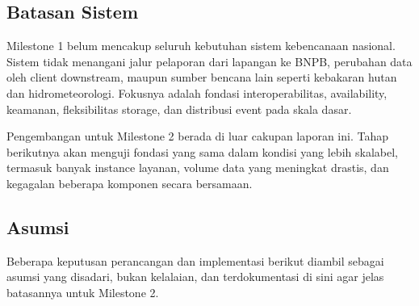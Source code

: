 \subsection{Batasan Sistem}

Milestone 1 belum mencakup seluruh kebutuhan sistem kebencanaan nasional.
Sistem tidak menangani jalur pelaporan dari lapangan ke BNPB, perubahan data oleh
client downstream, maupun sumber bencana lain seperti kebakaran hutan dan
hidrometeorologi. Fokusnya adalah fondasi interoperabilitas, availability,
keamanan, fleksibilitas storage, dan distribusi event pada skala dasar.

Pengembangan untuk Milestone 2 berada di luar cakupan laporan ini. Tahap
berikutnya akan menguji fondasi yang sama dalam kondisi yang lebih skalabel,
termasuk banyak instance layanan, volume data yang meningkat drastis, dan
kegagalan beberapa komponen secara bersamaan.

\subsection{Asumsi}
\label{sec:asumsi}

Beberapa keputusan perancangan dan implementasi berikut diambil sebagai asumsi
yang disadari, bukan kelalaian, dan terdokumentasi di sini agar jelas batasannya
untuk Milestone 2.

